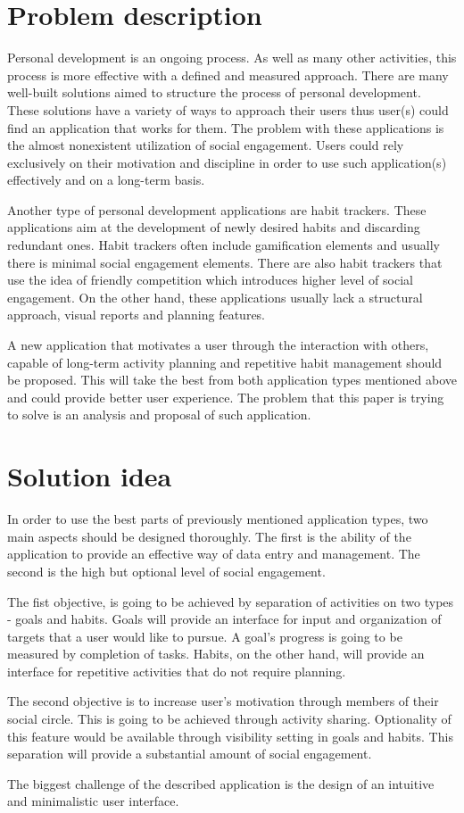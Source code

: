 \section{Problem description}\label{sec:problem-description}

Personal development is an ongoing process.
As well as many other activities, this process is more effective with a defined and measured approach.
There are many well-built solutions aimed to structure the process of personal development.
These solutions have a variety of ways to approach their users thus user(s) could find an application that works for them.
The problem with these applications is the almost nonexistent utilization of social engagement.
Users could rely exclusively on their motivation and discipline in order to use such application(s) effectively and on a long-term basis.

Another type of personal development applications are habit trackers.
These applications aim at the development of newly desired habits and discarding redundant ones.
Habit trackers often include gamification elements and usually there is minimal social engagement elements.
There are also habit trackers that use the idea of friendly competition which introduces higher level of social engagement.
On the other hand, these applications usually lack a structural approach, visual reports and planning features.

A new application that motivates a user through the interaction with others, capable of long-term activity planning and repetitive habit management should be proposed.
This will take the best from both application types mentioned above and could provide better user experience.
The problem that this paper is trying to solve is an analysis and proposal of such application.

\section{Solution idea}\label{sec:solution-idea}

In order to use the best parts of previously mentioned application types, two main aspects should be designed thoroughly.
The first is the ability of the application to provide an effective way of data entry and management.
The second is the high but optional level of social engagement.

The fist objective, is going to be achieved by separation of activities on two types - goals and habits.
Goals will provide an interface for input and organization of targets that a user would like to pursue.
A goal's progress is going to be measured by completion of tasks.
Habits, on the other hand, will provide an interface for repetitive activities that do not require planning.

The second objective is to increase user's motivation through members of their social circle.
This is going to be achieved through activity sharing.
Optionality of this feature would be available through visibility setting in goals and habits.
This separation will provide a substantial amount of social engagement.

The biggest challenge of the described application is the design of an intuitive and minimalistic user interface.